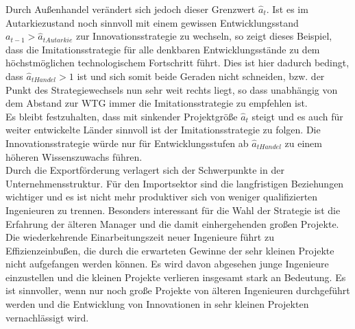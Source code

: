 Durch Au{\ss}enhandel verändert sich jedoch dieser Grenzwert $\hat{a}_t$. Ist es im Autarkiezustand noch sinnvoll mit einem gewissen Entwicklungsstand $a_{t-1}>\hat{a}_{tAutarkie}$ zur \textcolor[rgb]{0.74,0.97,0.22}{Innovationsstrategie} zu wechseln, so zeigt dieses Beispiel, dass die \textcolor[rgb]{0,0.32,0}{Imitationsstrategie} für alle denkbaren Entwicklungsstände zu dem höchstmöglichen technologischem Fortschritt führt. Dies ist hier dadurch bedingt, dass $\hat{a}_{tHandel}>1$ ist und sich somit beide Geraden nicht schneiden, bzw. der Punkt des Strategiewechsels nun sehr weit rechts liegt, so dass unabhängig von dem Abstand zur WTG immer die \textcolor[rgb]{0,0.32,0}{Imitationsstrategie} zu empfehlen ist.\\


Es bleibt festzuhalten, dass mit sinkender Projektgrö{\ss}e  $\hat{a}_t$ steigt und es auch für weiter entwickelte Länder sinnvoll ist der \textcolor[rgb]{0,0.32,0}{Imitationsstrategie} zu folgen. Die \textcolor[rgb]{0.74,0.97,0.22}{Innovationsstrategie} würde nur für Entwicklungsstufen ab $\hat{a}_{tHandel}$ zu einem höheren Wissenszuwachs führen. \\


Durch die Exportförderung verlagert sich der Schwerpunkte in der Unternehmensstruktur. Für den Importsektor sind die langfristigen Beziehungen wichtiger und es ist nicht mehr produktiver sich von weniger qualifizierten Ingenieuren zu trennen. Besonders interessant für die Wahl der Strategie ist die Erfahrung der älteren Manager und die damit einhergehenden gro{\ss}en Projekte. Die wiederkehrende Einarbeitungszeit neuer Ingenieure führt zu Effizienzeinbu{\ss}en, die durch die erwarteten Gewinne der sehr kleinen Projekte nicht aufgefangen werden können. Es wird davon abgesehen junge Ingenieure einzustellen und die kleinen Projekte verlieren insgesamt stark an Bedeutung. Es ist sinnvoller, wenn nur noch gro{\ss}e Projekte von älteren Ingenieuren durchgeführt werden und die Entwicklung von Innovationen in sehr kleinen Projekten vernachlässigt wird.\\

